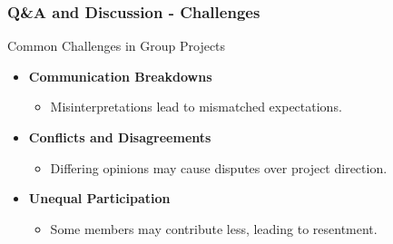 \documentclass[aspectratio=169]{beamer}
\begin{document}
\begin{frame}[fragile]
    \frametitle{Q\&A and Discussion - Challenges}
    \begin{block}{Common Challenges in Group Projects}
        \begin{itemize}
            \item \textbf{Communication Breakdowns}
                \begin{itemize}
                    \item Misinterpretations lead to mismatched expectations.
                \end{itemize}
            \item \textbf{Conflicts and Disagreements}
                \begin{itemize}
                    \item Differing opinions may cause disputes over project direction.
                \end{itemize}
            \item \textbf{Unequal Participation}
                \begin{itemize}
                    \item Some members may contribute less, leading to resentment.
                \end{itemize}
        \end{itemize}
    \end{block}
\end{frame}
\end{document}
